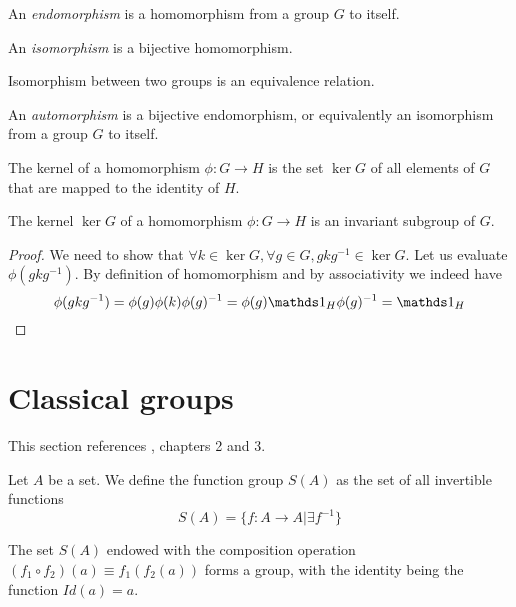 \begin{definition}[Endomorphism]
    An \emph{endomorphism} is a homomorphism from a group $G$ to itself.
\end{definition}

\begin{definition}[Isomorphism]
    An \emph{isomorphism} is a bijective homomorphism.
\end{definition}
\begin{remark}
    Isomorphism between two groups is an equivalence relation.
\end{remark}

\begin{definition}[Automorphism]
    An \emph{automorphism} is a bijective endomorphism, or equivalently an isomorphism from a group $G$ to itself.
\end{definition}

\begin{definition}[Kernel]
    The kernel of a homomorphism $\phi: G \rightarrow H$ is the set $\ker{G}$ of all elements of $G$ that are mapped to the identity of $H$.
\end{definition}

\begin{proposition}
    The kernel $\ker{G}$ of a homomorphism $\phi: G \rightarrow H$ is an invariant subgroup of $G$.
\end{proposition}
\begin{proof}
    We need to show that $\forall k \in \ker{G}, \forall g \in G, gkg^{-1} \in \ker{G}$.
    Let us evaluate $\phi(gkg^{-1})$. By definition of homomorphism and by associativity we indeed have
    \begin{equation*}
        \phi(gkg^{-1}) = \phi(g) \phi(k) \phi(g)^{-1} = \phi(g) \idop_H \phi(g)^{-1} = \idop_H
    \end{equation*}
\end{proof}


\section{Classical groups}
This section references \cite{Zucchini}, chapters 2 and 3.

\begin{definition}
    Let $A$ be a set. We define the function group $S(A)$ as the set of all invertible functions
    \begin{equation*}
        S(A) = \{f: A \rightarrow A | \exists f^{-1}\}
    \end{equation*}
\end{definition}
\begin{proposition}
    The set $S(A)$ endowed with the composition operation $(f_1 \circ f_2)(a) \equiv f_1(f_2(a))$ forms a group, with the identity being the function $Id(a) = a$.
\end{proposition}

